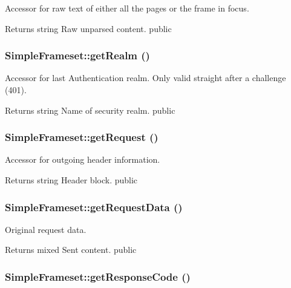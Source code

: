 Accessor for raw text of either all the pages or the frame in focus. \begin{DoxyReturn}{Returns}
string Raw unparsed content.  public 
\end{DoxyReturn}
\hypertarget{class_simple_frameset_ace3bb1323f9525987fea97858f6a5dd5}{
\subsubsection[{getRealm}]{\setlength{\rightskip}{0pt plus 5cm}SimpleFrameset::getRealm ()}}
\label{class_simple_frameset_ace3bb1323f9525987fea97858f6a5dd5}
Accessor for last Authentication realm. Only valid straight after a challenge (401). \begin{DoxyReturn}{Returns}
string Name of security realm.  public 
\end{DoxyReturn}
\hypertarget{class_simple_frameset_adf904d92dc2cc2da34d028929d200280}{
\subsubsection[{getRequest}]{\setlength{\rightskip}{0pt plus 5cm}SimpleFrameset::getRequest ()}}
\label{class_simple_frameset_adf904d92dc2cc2da34d028929d200280}
Accessor for outgoing header information. \begin{DoxyReturn}{Returns}
string Header block.  public 
\end{DoxyReturn}
\hypertarget{class_simple_frameset_aa920a4af7e2d5cbb35319111813edf5c}{
\subsubsection[{getRequestData}]{\setlength{\rightskip}{0pt plus 5cm}SimpleFrameset::getRequestData ()}}
\label{class_simple_frameset_aa920a4af7e2d5cbb35319111813edf5c}
Original request data. \begin{DoxyReturn}{Returns}
mixed Sent content.  public 
\end{DoxyReturn}
\hypertarget{class_simple_frameset_a49557a01b0b0ce760bb5a4497c2e1055}{
\subsubsection[{getResponseCode}]{\setlength{\rightskip}{0pt plus 5cm}SimpleFrameset::getResponseCode ()}}

